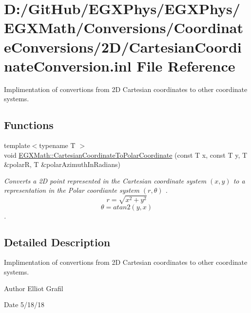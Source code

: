 \hypertarget{_cartesian_coordinate_conversion_8inl}{}\section{D\+:/\+Git\+Hub/\+E\+G\+X\+Phys/\+E\+G\+X\+Phys/\+E\+G\+X\+Math/\+Conversions/\+Coordinate\+Conversions/2\+D/\+Cartesian\+Coordinate\+Conversion.inl File Reference}
\label{_cartesian_coordinate_conversion_8inl}


Implimentation of convertions from 2D Cartesian coordinates to other coordinate systems.  


\subsection*{Functions}
\begin{DoxyCompactItemize}
\item 
{\footnotesize template$<$typename T $>$ }\\void \mbox{\hyperlink{group___e_g_x_math-_conversions-_coordinate_conversions-2_d-_cartesian_ga606ec2b97e0000d9b2a511c0e7b74bc9}{E\+G\+X\+Math\+::\+Cartesian\+Coordinate\+To\+Polar\+Coordinate}} (const T x, const T y, T \&polarR, T \&polar\+Azimuth\+In\+Radians)
\begin{DoxyCompactList}\small\item\em Converts a 2D point represented in the Cartesian coordinate system $(x,y)$ to a representation in the Polar coordiante system $(r,\theta)$ . \[ r = \sqrt{x^2+y^2} \] \[ \theta = atan2(y,x) \]. \end{DoxyCompactList}\end{DoxyCompactItemize}


\subsection{Detailed Description}
Implimentation of convertions from 2D Cartesian coordinates to other coordinate systems. 

\begin{DoxyAuthor}{Author}
Elliot Grafil 
\end{DoxyAuthor}
\begin{DoxyDate}{Date}
5/18/18 
\end{DoxyDate}
